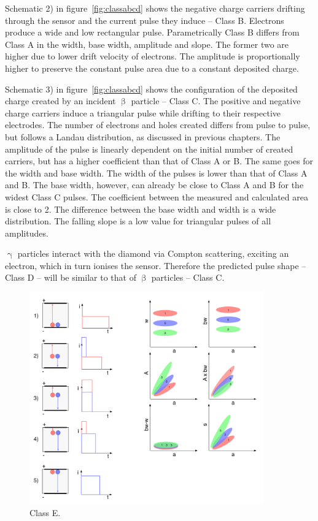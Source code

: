 Schematic 2) in figure~\ref{fig:classabcd} shows the negative charge carriers drifting through the sensor and the current pulse they induce -- Class B. Electrons produce a wide and low rectangular pulse. Parametrically Class B differs from Class A in the width, base width, amplitude and slope. The former two are higher due to lower drift velocity of electrons. The amplitude is proportionally higher to preserve the constant pulse area due to a constant deposited charge.

Schematic 3) in figure~\ref{fig:classabcd} shows the configuration of the deposited charge created by an incident $\upbeta$ particle -- Class C. The positive and negative charge carriers induce a triangular pulse while drifting to their respective electrodes. The number of electrons and holes created differs from pulse to pulse, but follows a Landau distribution, as discussed in previous chapters. The amplitude of the pulse is linearly dependent on the initial number of created carriers, but has a higher coefficient than that of Class A or B. The same goes for the width and base width. The width of the pulses is lower than that of Class A and B. The base width, however, can already be close to Class A and B for the widest Class C pulses. The coefficient between the measured and calculated area is close to 2. The difference between the base width and width is a wide distribution. The falling slope is a low value for triangular pulses of all amplitudes.

$\upgamma$ particles interact with the diamond via Compton scattering, exciting an electron, which in turn ionises the sensor. Therefore the predicted pulse shape -- Class D -- will be similar to that of $\upbeta$ particles -- Class C. 





\clearpage

\begin{figure}[!t]
\centering
\includegraphics[width=0.9\textwidth]{05_current_monitoring/plots/classE}
\caption{Class E.}
\label{fig:classe}
\end{figure}

